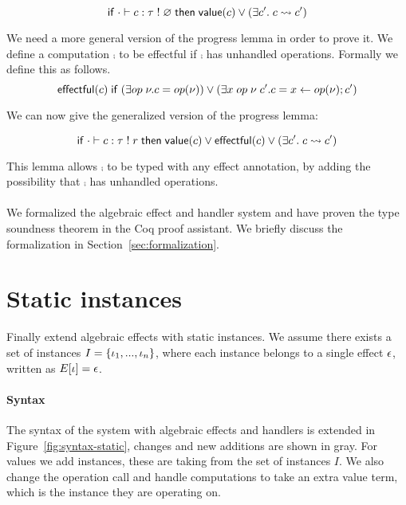 {\begin{lemma}[Progress]
\[
	\mathsf{if}\;
		\cdot \vdash c : \tau \; ! \; \varnothing
	\;\mathsf{then}\;
		\mathsf{value}(c)
		\lor
		(\exists c'.\; c \rightsquigarrow c')
\]
\end{lemma}

We need a more general version of the progress lemma in order to prove it.
We define a computation $\comp$ to be effectful if $\comp$ has unhandled operations.
Formally we define this as follows.
	\[ \mathsf{effectful}(c) \;\mathsf{if}\; (\exists op \; \nu. c = op(\nu)) \lor (\exists x \; op \; \nu \; c'. c = x \leftarrow op(\nu) ; c') \]

We can now give the generalized version of the progress lemma:

\begin{lemma}
\[
	\mathsf{if}\;
		\cdot \vdash c : \tau \; ! \; r
	\;\mathsf{then}\;
		\mathsf{value}(c)
		\lor
		\mathsf{effectful}(c)
		\lor
		(\exists c'.\; c \rightsquigarrow c')
\]
\end{lemma}

This lemma allows $\comp$ to be typed with any effect annotation, by adding the possibility that $\comp$ has unhandled operations.
\\\\
We formalized the algebraic effect and handler system and have proven the type soundness theorem in the Coq proof assistant.
We briefly discuss the formalization in Section~\ref{sec:formalization}.

\newpage
\section{Static instances} \label{section:staticinst}

Finally extend algebraic effects with static instances. We assume there exists a set of instances $I = \{ \iota_1, ..., \iota_n \}$, where each instance belongs to a single effect $\epsilon$, written as $E[\iota] = \epsilon$.

\paragraph{Syntax}
The syntax of the system with algebraic effects and handlers is extended in Figure~\ref{fig:syntax-static}, changes and new additions are shown in gray. For values we add instances, these are taking from the set of instances $I$. We also change the operation call and handle computations to take an extra value term, which is the instance they are operating on.

}
